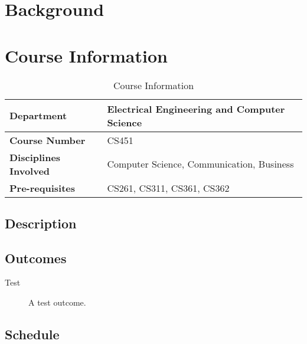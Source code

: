 \documentclass[12pt,letterpaper]{article}
\begin{document}
\section{Background}

\section{Course Information}

\begin{table}[h]
  \begin{center}
    \begin{tabular}{ | l | l | }
      \hline
      \textbf{Department}
        & Electrical Engineering and Computer Science \\ \hline
      \textbf{Course Number}
        & CS451 \\ \hline
      \textbf{Disciplines Involved}
        & Computer Science, Communication, Business \\ \hline
      \textbf{Pre-requisites}
        & CS261, CS311, CS361, CS362 \\ \hline
    \end{tabular}
    \caption{Course Information}
  \end{center}
\end{table}

\subsection{Description}

\subsection{Outcomes}
\begin{description}
  \item[Test] A test outcome.
\end{description}

\subsection{Schedule}
\end{document}
